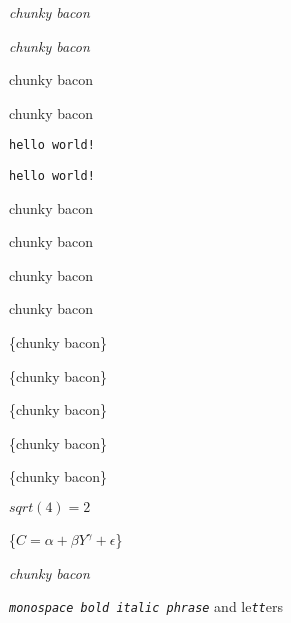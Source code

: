
\emph{chunky bacon}

\emph{chunky bacon}

chunky bacon

chunky bacon

{\tt hello world!}

{\tt hello world!}

chunky bacon

chunky bacon

chunky bacon

chunky bacon

\unknown\{chunky bacon\}

\unknown\{chunky bacon\}

\unknown\{chunky bacon\}

\unknown\{chunky bacon\}

\unknown\{chunky bacon\}

$sqrt(4) = 2$

\unknown\{$C = \alpha + \beta Y^{\gamma} + \epsilon$\}

\emph{chunky bacon}

{\tt \emph{monospace bold italic phrase}} and le{\tt \emph{tt}}ers
